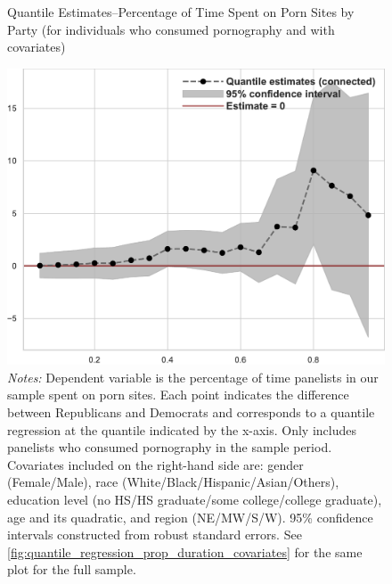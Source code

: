 \documentclass[12pt, letterpaper]{article}
\begin{document}
\begin{figure}[ht]
	\centering
	\caption{Quantile Estimates--Percentage of Time Spent on Porn Sites by Party (for individuals who consumed pornography and with covariates)}
	\includegraphics[width=.55\linewidth]{../figs/quantile_reg_nonzero_covariates_proportion_duration_adult.pdf}
	\caption*{\footnotesize \emph{Notes:} 
		Dependent variable is the percentage of time panelists in our sample spent on porn sites.
		Each point indicates the difference between Republicans and Democrats and corresponds to a quantile regression at the quantile indicated by the x-axis.
		Only includes panelists who consumed pornography in the sample period.
		Covariates included on the right-hand side are: gender (Female/Male), race (White/Black/Hispanic/Asian/Others), education level (no HS/HS graduate/some college/college graduate), age and its quadratic, and region (NE/MW/S/W).
		95\% confidence intervals constructed from robust standard errors.
		See \cref{fig:quantile_regression_prop_duration_covariates} for the same plot for the full sample.
	}
	\label{fig:quantile_regression_prop_duration_nonzeroes_covariates}
\end{figure}
\FloatBarrier

\end{document}
